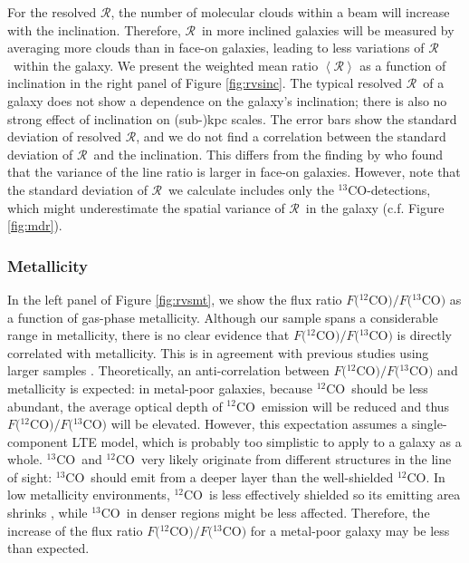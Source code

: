 \documentclass{emulateapj}
\def\ttco{\mbox{$^{13}$CO}}
\def\twco{\mbox{$^{12}$CO}}
\def\rtt{$\mathcal{R}$}
\begin{document}
For the resolved \rtt, the number of molecular clouds within a beam will increase with the inclination.  
Therefore, \rtt \ in more inclined galaxies will be measured by averaging
more clouds than in face-on galaxies, 
leading to less variations of \rtt \ within the galaxy. 
We present the weighted mean ratio $\left<\mathcal{R}\right>$ as
a function of inclination in the right panel of Figure \ref{fig:rvsinc}. 
The typical resolved \rtt \ of a galaxy does not show a dependence on the galaxy's inclination; 
there is also no strong effect of inclination on (sub-)kpc scales. 
The error bars show the standard deviation of resolved \rtt, 
and we do not find a correlation between the standard deviation of \rtt \ and the inclination. 
This differs from the finding by \citet{S&I1991} who found that 
the variance of the line ratio is larger in face-on galaxies.    
However, note that the standard deviation of \rtt \ we calculate includes 
only the \ttco-detections, which might underestimate the spatial variance of \rtt \ in the galaxy (c.f. Figure \ref{fig:mdr}).  

\subsubsection{Metallicity}

\begin{figure*}
\caption{
\textit{Left}: Flux ratio $F($\twco$)/F($\ttco$)$ 
as a function of galaxy metallicity. 
The vertical error bars 
show the uncertainty in the flux ratio. 
The references for  
metallicity are listed in Table \ref{table:ginfo}.
\textit{Right}: \ttco \ intensity weighted mean ratio 
$\left<\mathcal{R}\right>$ as a function of 
galaxy metallicity. The vertical error bars 
show the intensity weighted standard deviation of \rtt.
}
\label{fig:rvsmt}
\end{figure*}

In the left panel of Figure \ref{fig:rvsmt}, we show the flux ratio $F($\twco$)/F($\ttco$)$ as a function of gas-phase metallicity. 
Although our sample spans a considerable range in metallicity, 
there is no clear evidence that $F($\twco$)/F($\ttco$)$ is directly correlated with metallicity.
This is in agreement with previous studies using larger samples 
\citep{S&I1991, Crocker2012}. 
Theoretically, an anti-correlation between $F($\twco$)/F($\ttco$)$ and metallicity is expected: in metal-poor galaxies, because \twco \ should be less abundant, 
the average optical depth of \twco \ emission will be reduced and
thus $F($\twco$)/F($\ttco$)$ will be elevated. 
However, this expectation assumes a single-component LTE model, which is probably too simplistic to apply to a galaxy as a whole. 
\ttco \ and \twco \ very likely
originate from different structures in the line of sight:
\ttco \ should emit from a deeper layer than the well-shielded \twco.
In low metallicity environments,
\twco \ is less effectively shielded so its emitting area shrinks \citep[e.g.][]{Wolfire2010}, while
\ttco \ in denser regions might be less affected.
Therefore, the increase of the flux ratio $F($\twco$)/F($\ttco$)$ for a 
metal-poor galaxy may be less than expected.
\end{document}
